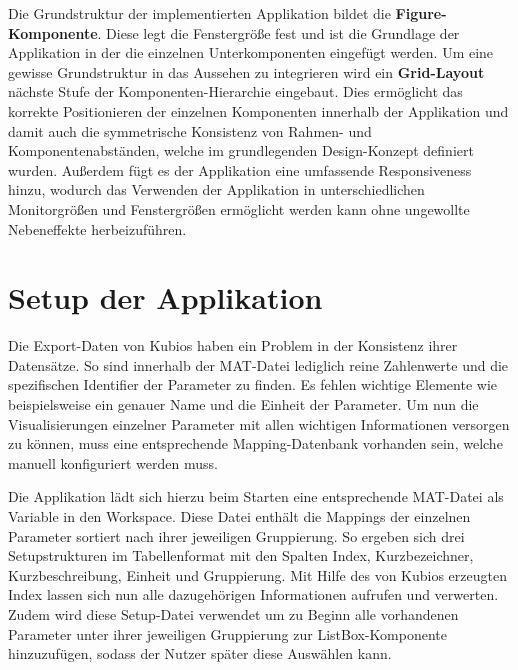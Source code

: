 

Die Grundstruktur der implementierten Applikation bildet die \textbf{Figure-Komponente}. Diese legt die Fenstergröße fest und ist die Grundlage der Applikation in der die einzelnen Unterkomponenten eingefügt werden. Um eine gewisse Grundstruktur in das Aussehen zu integrieren wird ein \textbf{Grid-Layout} nächste Stufe der Komponenten-Hierarchie eingebaut. Dies ermöglicht das korrekte Positionieren der einzelnen Komponenten innerhalb der Applikation und damit auch die symmetrische Konsistenz von Rahmen- und Komponentenabständen, welche im grundlegenden Design-Konzept definiert wurden. Außerdem fügt es der Applikation eine umfassende Responsiveness hinzu, wodurch das Verwenden der Applikation in unterschiedlichen Monitorgrößen und Fenstergrößen ermöglicht werden kann ohne ungewollte Nebeneffekte herbeizuführen.




\section{Setup der Applikation}

Die Export-Daten von Kubios haben ein Problem in der Konsistenz ihrer Datensätze. So sind innerhalb der MAT-Datei lediglich reine Zahlenwerte und die spezifischen Identifier der Parameter zu finden. Es fehlen wichtige Elemente wie beispielsweise ein genauer Name und die Einheit der Parameter. Um nun die Visualisierungen einzelner Parameter mit allen wichtigen Informationen versorgen zu können, muss eine entsprechende Mapping-Datenbank vorhanden sein, welche manuell konfiguriert werden muss.

Die Applikation lädt sich hierzu beim Starten eine entsprechende MAT-Datei als Variable in den Workspace. Diese Datei enthält die Mappings der einzelnen Parameter sortiert nach ihrer jeweiligen Gruppierung. So ergeben sich drei Setupstrukturen im Tabellenformat mit den Spalten Index, Kurzbezeichner, Kurzbeschreibung, Einheit und Gruppierung. Mit Hilfe des von Kubios erzeugten Index lassen sich nun alle dazugehörigen Informationen aufrufen und verwerten. Zudem wird diese Setup-Datei verwendet um zu Beginn alle vorhandenen Parameter unter ihrer jeweiligen Gruppierung zur ListBox-Komponente hinzuzufügen, sodass der Nutzer später diese Auswählen kann.

